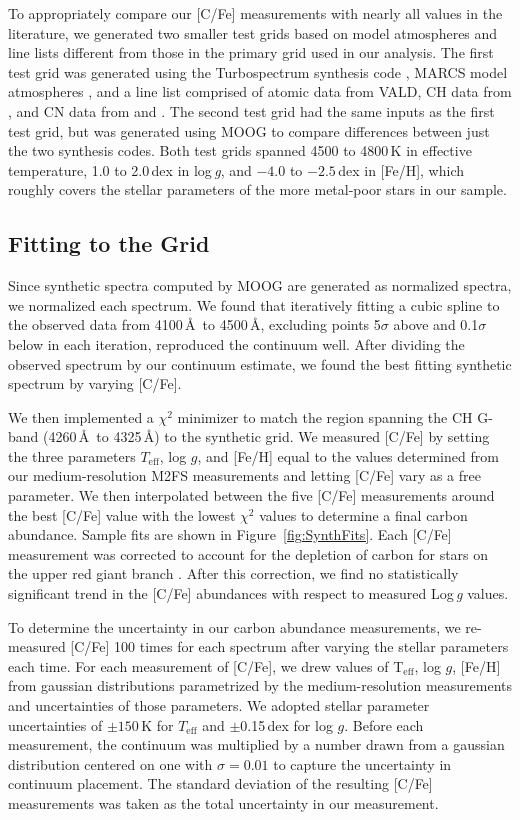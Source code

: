 \documentclass{emulateapj-rtx4}
\begin{document}
To appropriately compare our [C/Fe] measurements with nearly all values in the literature,
we generated two smaller test grids based on model atmospheres and line lists different from those in the primary grid used in our analysis.
The first test grid was generated using the Turbospectrum synthesis code \citep{ap+98,p+12}, MARCS
model atmospheres \citep{gee+08}, and a line list comprised of atomic data from VALD, CH data from \citet{mpv+14}, 
and CN data from \citet{brw+14} and \citet{slr+14}. The second test grid had the same inputs
as the first test grid, but was generated using MOOG to compare differences
between just the two synthesis codes. Both test grids spanned 4500 to 4800\,K in effective
temperature, 1.0 to 2.0\,dex in log\,\textit{g}, and $-4.0$ to $-2.5\,$dex in [Fe/H], which roughly 
covers the stellar parameters of the more metal-poor stars in our sample.

\subsection{Fitting to the Grid}
\label{sec:gridfit}


Since synthetic spectra computed by MOOG are generated as normalized spectra,
we normalized each spectrum. We found that iteratively fitting a cubic spline 
to the observed data from 4100\,\AA\, to 4500\,\AA, excluding points 5$\sigma$ above and 0.1$\sigma$ below in each iteration,
reproduced the continuum well. After dividing the observed spectrum
by our continuum estimate, we found the best fitting synthetic spectrum by varying [C/Fe]. 

We then implemented a $\chi^2$ minimizer to match the region spanning the CH G-band 
(4260\,\AA\, to 4325\,\AA) to the synthetic grid. 
We measured [C/Fe] by setting the three parameters $T_\text{eff}$, log $g$, 
and [Fe/H] equal to the values determined from our medium-resolution M2FS measurements and letting 
[C/Fe] vary as a free parameter. We then interpolated between the five [C/Fe] measurements
around the best [C/Fe] value with the lowest $\chi^2$ values to determine a final carbon abundance. 
Sample fits are shown in Figure~\ref{fig:SynthFits}. Each [C/Fe] measurement was 
corrected to account for the depletion of carbon for stars on the upper red giant branch 
\citep{pfb+14}.
After this correction, we find no statistically significant trend in the [C/Fe] abundances with respect to measured Log\,\textit{g} values.

To determine the uncertainty in our carbon abundance measurements, we re-measured [C/Fe] 100 times for each spectrum after
varying the stellar parameters each time. For each measurement of [C/Fe], we drew values of T$_\text{eff}$, log $g$, 
[Fe/H] from gaussian distributions parametrized by the medium-resolution measurements and uncertainties of those parameters. 
We adopted stellar parameter uncertainties of $\pm150$\,K for $T_\text{eff}$ and $\pm$0.15\,dex for log $g$. 
Before each measurement, the continuum was multiplied by a number drawn
from a gaussian distribution centered on one with $\sigma = 0.01$ to capture the uncertainty in continuum placement. 
The standard deviation of the resulting [C/Fe] measurements was taken as the total uncertainty 
in our measurement.
\end{document}
